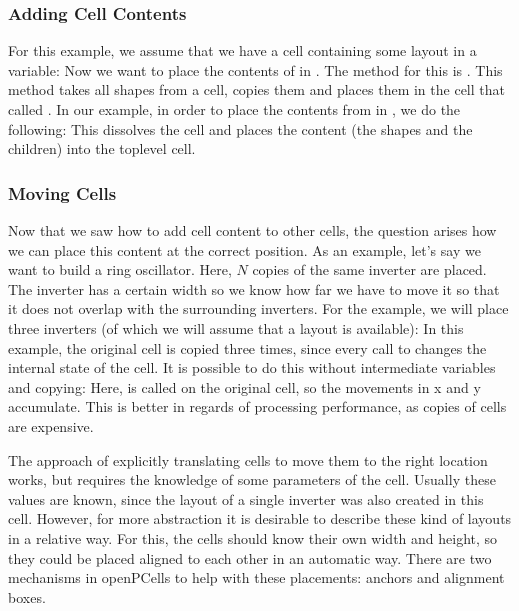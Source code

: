 \subsubsection{Adding Cell Contents}
For this example, we assume that we have a cell containing some layout in a variable:
Now we want to place the contents of  in .
The method for this is .
This method takes all shapes from a cell, copies them and places them in the cell that called .
In our example, in order to place the contents from  in , we do the following:
This dissolves the cell and places the content (the shapes and the children) into the toplevel cell.

\subsubsection{Moving Cells}
Now that we saw how to add cell content to other cells, the question arises how we can place this content at the correct position.
As an example, let's say we want to build a ring oscillator. Here, $N$ copies of the same inverter are placed.
The inverter has a certain width so we know how far we have to move it so that it does not overlap with the surrounding inverters.
For the example, we will place three inverters (of which we will assume that a layout is available):
In this example, the original cell is copied three times, since every call to  changes the internal state of the cell.
It is possible to do this without intermediate variables and copying:
Here,  is called on the original cell, so the movements in x and y accumulate.
This is better in regards of processing performance, as copies of cells are expensive.

The approach of explicitly translating cells to move them to the right location works, but requires the knowledge of some parameters of the cell.
Usually these values are known, since the layout of a single inverter was also created in this cell.
However, for more abstraction it is desirable to describe these kind of layouts in a relative way.
For this, the cells should know their own width and height, so they could be placed aligned to each other in an automatic way.
There are two mechanisms in openPCells to help with these placements: anchors and alignment boxes.

